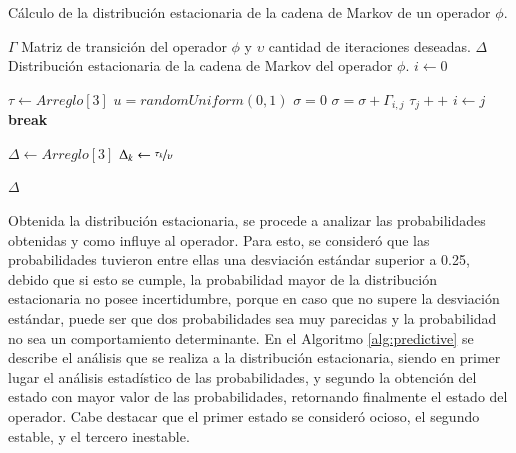 \begin{algorithm}[!ht]
	\caption{Cálculo de la distribución estacionaria de la cadena de Markov de un operador $\phi$.}
	\label{alg:distEstacionaria}
	\begin{algorithmic}[1]
	\REQUIRE $\Gamma$ Matriz de transición del operador $\phi$ y $\upsilon$ cantidad de iteraciones deseadas.
	\ENSURE $\Delta$ Distribución estacionaria de la cadena de Markov del operador $\phi$.
	\STATE $i \leftarrow 0$ 
		\ENDIF
	\ENDFOR
	
	\STATE $\tau \leftarrow Arreglo[3]$ 
		\STATE $u = randomUniform(0,1)$
		\STATE $\sigma = 0$
			\STATE $\sigma = \sigma + \Gamma_{i,j}$
				\STATE $\tau_{j}++$
				\STATE $i \leftarrow j$
				\STATE \textbf{break}
			\ENDIF
		\ENDFOR
	\ENDFOR

	\STATE $\Delta \leftarrow Arreglo[3]$ 
		\STATE $\Delta_{k} \leftarrow \nicefrac{\tau_{k}}{\upsilon}$
	\ENDFOR	
	
	\RETURN $\Delta$
	
	\end{algorithmic}
\end{algorithm}

Obtenida la distribución estacionaria, se procede a analizar las probabilidades obtenidas y como influye al operador. Para esto, se consideró que las probabilidades tuvieron entre ellas una desviación estándar superior a 0.25, debido que si esto se cumple, la probabilidad mayor de la distribución estacionaria no posee incertidumbre, porque en caso que no supere la desviación estándar, puede ser que dos probabilidades sea muy parecidas y la probabilidad no sea un comportamiento determinante. En el Algoritmo \ref{alg:predictive} se describe el análisis que se realiza a la distribución estacionaria, siendo en primer lugar el análisis estadístico de las probabilidades, y segundo la obtención del estado con mayor valor de las probabilidades, retornando finalmente el estado del operador. Cabe destacar que el primer estado se consideró ocioso, el segundo estable, y el tercero inestable.


